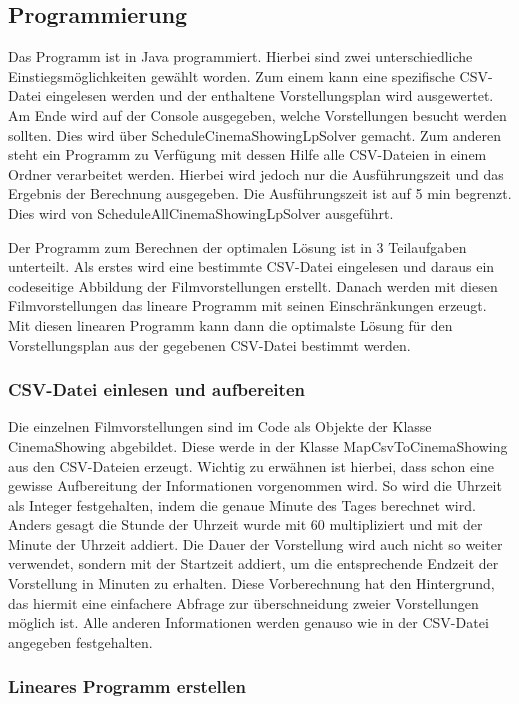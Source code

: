 \documentclass[a4paper, 12pt]{article}
\begin{document}
\subsection{Programmierung}

Das Programm ist in Java programmiert.
Hierbei sind zwei unterschiedliche Einstiegsmöglichkeiten gewählt worden. 
Zum einem kann eine spezifische CSV-Datei eingelesen werden und der enthaltene Vorstellungsplan wird ausgewertet.
Am Ende wird auf der Console ausgegeben, welche Vorstellungen besucht werden sollten. 
Dies wird über ScheduleCinemaShowingLpSolver gemacht.
Zum anderen steht ein Programm zu Verfügung mit dessen Hilfe alle CSV-Dateien in einem Ordner verarbeitet werden.
Hierbei wird jedoch nur die Ausführungszeit und das Ergebnis der Berechnung ausgegeben.
Die Ausführungszeit ist auf 5 min begrenzt.
Dies wird von ScheduleAllCinemaShowingLpSolver ausgeführt.

Der Programm zum Berechnen der optimalen Lösung ist in 3 Teilaufgaben unterteilt. 
Als erstes wird eine bestimmte CSV-Datei eingelesen und daraus ein codeseitige Abbildung der Filmvorstellungen erstellt.
Danach werden mit diesen Filmvorstellungen das lineare Programm mit seinen Einschränkungen erzeugt.
Mit diesen linearen Programm kann dann die optimalste Lösung für den Vorstellungsplan aus der gegebenen CSV-Datei bestimmt werden.

\subsubsection{CSV-Datei einlesen und aufbereiten}

Die einzelnen Filmvorstellungen sind im Code als Objekte der Klasse CinemaShowing abgebildet.
Diese werde in der Klasse MapCsvToCinemaShowing aus den CSV-Dateien erzeugt.
Wichtig zu erwähnen ist hierbei, dass schon eine gewisse Aufbereitung der Informationen vorgenommen wird.
So wird die Uhrzeit als Integer festgehalten, indem die genaue Minute des Tages berechnet wird. 
Anders gesagt die Stunde der Uhrzeit wurde mit 60 multipliziert und mit der Minute der Uhrzeit addiert.
Die Dauer der Vorstellung wird auch nicht so weiter verwendet, sondern mit der Startzeit addiert, um die entsprechende Endzeit der Vorstellung in Minuten zu erhalten.
Diese Vorberechnung hat den Hintergrund, das hiermit eine einfachere Abfrage zur überschneidung zweier Vorstellungen möglich ist.
Alle anderen Informationen werden genauso wie in der CSV-Datei angegeben festgehalten.

\subsubsection{Lineares Programm erstellen}
\end{document}
